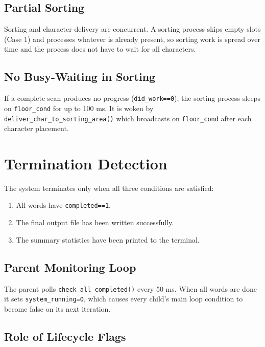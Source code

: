 \documentclass[12pt,a4paper]{article}
\newcommand{\code}[1]{\texttt{\small #1}}
\begin{document}
\subsection{Partial Sorting}

Sorting and character delivery are concurrent. A sorting process skips empty slots
(Case 1) and processes whatever is already present, so sorting work is spread over
time and the process does not have to wait for all characters.

\subsection{No Busy-Waiting in Sorting}

If a complete scan produces no progress (\code{did\_work==0}), the sorting process
sleeps on \code{floor\_cond} for up to 100 ms. It is woken by
\code{deliver\_char\_to\_sorting\_area()} which broadcasts on \code{floor\_cond}
after each character placement.

\section{Termination Detection}

The system terminates only when all three conditions are satisfied:

\begin{enumerate}
  \item All words have \code{completed==1}.
  \item The final output file has been written successfully.
  \item The summary statistics have been printed to the terminal.
\end{enumerate}

\subsection{Parent Monitoring Loop}

The parent polls \code{check\_all\_completed()} every 50 ms. When all words are
done it sets \code{system\_running=0}, which causes every child's main loop
condition to become false on its next iteration.

\subsection{Role of Lifecycle Flags}
\end{document}
